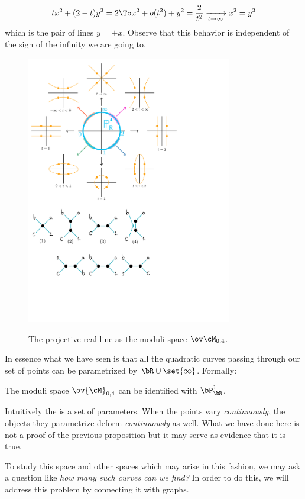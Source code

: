 \documentclass[12pt]{memoir}
\begin{document}
$$tx^2+(2-t)y^2=2\To x^2+o(t^2)+y^2=\frac{2}{t^2}\xrightarrow[t\to\infty]{}x^2=y^2$$
which is the pair of lines $y=\pm x$. Observe that this behavior is independent of the sign of the infinity we are going to. 
\begin{figure}[h!]
    \centering
    \includegraphics[width=0.8\textwidth, trim= 0.25cm 13.1cm 5.25cm 0.5cm,clip]{fig2.pdf}
    \label{fig2}
    \caption{The projective real line as the moduli space $\ov\cM_{0,4}$.}
\end{figure}
In essence what we have seen is that all the quadratic curves passing through our set of points can be parametrized by $\bR\cup\set{\infty}$. Formally:
\begin{Prop}
The moduli space $\ov{\cM}_{0,4}$ can be identified with $\bP^1_\bR$.
\end{Prop}
Intuitively the  is a set of parameters. When the points vary \emph{continuously}, the objects they parametrize deform \emph{continuously} as well. What we have done here is not a proof of the previous proposition but it may serve as evidence that it is true.\par 
To study this space and other spaces which may arise in this fashion, we may ask a question like \emph{how many such curves can we find?} In order to do this, we will address this problem by connecting it with graphs. 
\end{document}
